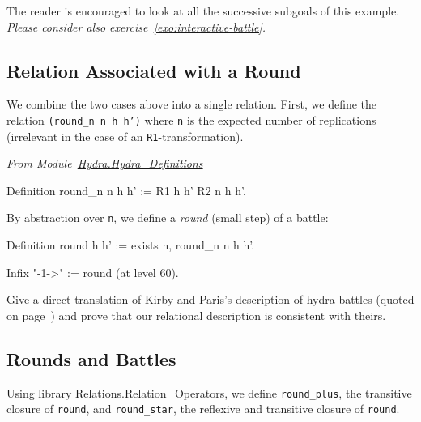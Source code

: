 The reader is encouraged to look at all the successive subgoals of this example.
\emph{Please consider also exercise~\vref{exo:interactive-battle}.}


\subsection{Relation Associated with a Round}

We combine the two cases above into a single relation.
First,  we define the  relation \texttt{(round\_n n h h')} where \texttt{n} is the expected number of  replications (irrelevant in the case of an \texttt{R1}-transformation).

\vspace{4pt}
\emph{From Module~\href{../theories/html/hydras.Hydra.Hydra_Definitions.html\#round_n}{Hydra.Hydra\_Definitions}}


\begin{Coqsrc}
Definition round_n n h h' := R1 h h' \/ R2 n h h'.  
\end{Coqsrc}

By abstraction over \texttt{n}, we define a \emph{round} (small step) of a battle:

\label{sect:infix-round}
\begin{Coqsrc}
Definition round h h' := exists n,  round_n n h h'.

Infix "-1->" := round (at level 60).
\end{Coqsrc}


\begin{project}
Give a direct translation of Kirby and Paris's description of hydra battles (quoted on page~\pageref{original-rules}) and prove that our relational description is consistent with theirs.
\end{project}


\subsection{Rounds and Battles}


Using library \href{https://coq.inria.fr/distrib/current/stdlib/Coq.Relations.Relation_Operators.html}{Relations.Relation\_Operators}, we define \texttt{round\_plus},  the transitive closure of \texttt{round}, and \texttt{round\_star},  the reflexive and transitive closure of \texttt{round}.

